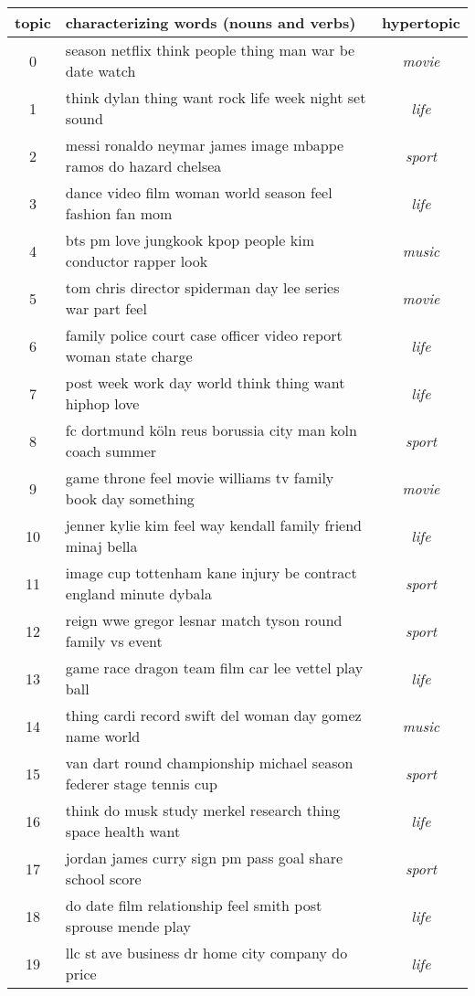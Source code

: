 \begin{tabular}{clc}\toprule topic & characterizing words (nouns and verbs) & hypertopic\\\toprule
0 & season netflix think people thing man war be date watch & \textit{movie} \\
1 & think dylan thing want rock life week night set sound & \textit{life} \\
2 & messi ronaldo neymar james image mbappe ramos do hazard chelsea & \textit{sport} \\
3 & dance video film woman world season feel fashion fan mom & \textit{life} \\
4 & bts pm love jungkook kpop people kim conductor rapper look & \textit{music} \\
5 & tom chris director spiderman day lee series war part feel & \textit{movie} \\
6 & family police court case officer video report woman state charge & \textit{life} \\
7 & post week work day world think thing want hiphop love & \textit{life} \\
8 & fc dortmund köln reus borussia city man koln coach summer & \textit{sport} \\
9 & game throne feel movie williams tv family book day something & \textit{movie} \\
10 & jenner kylie kim feel way kendall family friend minaj bella & \textit{life} \\
11 & image cup tottenham kane injury be contract england minute dybala & \textit{sport} \\
12 & reign wwe gregor lesnar match tyson round family vs event & \textit{sport} \\
13 & game race dragon team film car lee vettel play ball & \textit{life} \\
14 & thing cardi record swift del woman day gomez name world & \textit{music} \\
15 & van dart round championship michael season federer stage tennis cup & \textit{sport} \\
16 & think do musk study merkel research thing space health want & \textit{life} \\
17 & jordan james curry sign pm pass goal share school score & \textit{sport} \\
18 & do date film relationship feel smith post sprouse mende play & \textit{life} \\
19 & llc st ave business dr home city company do price & \textit{life} \\
\bottomrule\end{tabular}